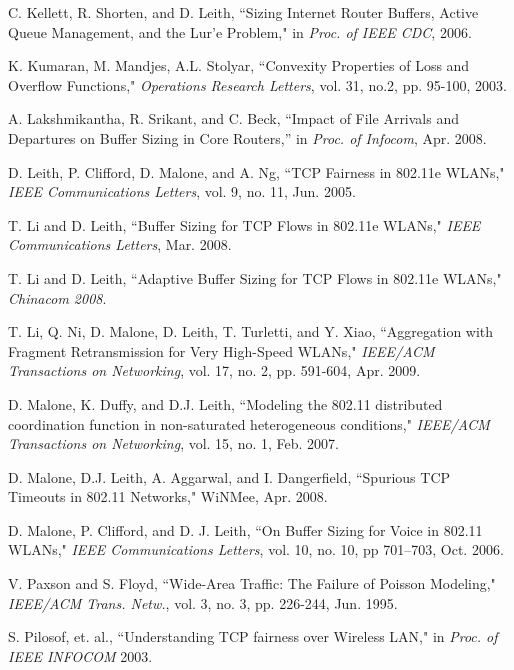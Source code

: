 \documentclass[10pt,twocolumn, journal]{IEEEtran}
\begin{document}
\begin{thebibliography}{}
C. Kellett, R. Shorten, and D. Leith, ``Sizing Internet Router Buffers, Active Queue
Management, and the Lur'e Problem," in \emph{Proc. of IEEE CDC}, 2006.

K. Kumaran, M. Mandjes, A.L. Stolyar, ``Convexity Properties of Loss and Overflow Functions," \textit{Operations Research Letters},  vol. 31, no.2, pp. 95-100, 2003.


A. Lakshmikantha, R. Srikant, and C. Beck, ``Impact of File Arrivals and Departures on Buffer Sizing in Core Routers,'' in \emph{Proc. of Infocom}, Apr. 2008.


D. Leith, P. Clifford, D. Malone, and A. Ng,  ``TCP Fairness in 802.11e WLANs,"
\emph{IEEE Communications Letters}, vol. 9, no. 11, Jun. 2005.

T. Li and D. Leith,  ``Buffer Sizing for TCP Flows in 802.11e WLANs," \emph{IEEE
Communications Letters}, Mar. 2008.

T. Li and D. Leith,  ``Adaptive Buffer Sizing for TCP Flows in 802.11e WLANs,"
\emph{Chinacom 2008}.

T. Li, Q. Ni, D. Malone, D. Leith, T. Turletti, and Y. Xiao, ``Aggregation with Fragment
Retransmission for Very High-Speed WLANs,"  \emph{IEEE/ACM Transactions on Networking},
vol. 17, no. 2, pp. 591-604, Apr. 2009.

D. Malone, K. Duffy, and D.J. Leith, ``Modeling the 802.11 distributed coordination
function in non-saturated heterogeneous conditions," \emph{IEEE/ACM Transactions on
Networking}, vol. 15, no. 1, Feb. 2007.

D. Malone, D.J. Leith, A. Aggarwal, and I. Dangerfield,	``Spurious TCP Timeouts in 802.11 Networks," WiNMee,	Apr. 2008.


D. Malone, P. Clifford, and D. J. Leith, ``On Buffer Sizing for Voice in 802.11 WLANs,"
\emph{IEEE Communications Letters}, vol. 10, no. 10, pp 701--703, Oct. 2006.

V. Paxson and S. Floyd, ``Wide-Area Traffic: The Failure of Poisson Modeling,"
\emph{IEEE/ACM Trans. Netw.}, vol. 3, no. 3, pp. 226-244, Jun. 1995.


S. Pilosof, et. al., ``Understanding TCP fairness over Wireless LAN," in \emph{Proc. of
IEEE INFOCOM} 2003.



\end{thebibliography}
\end{document}
